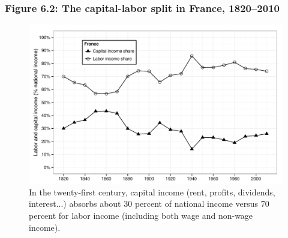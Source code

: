 \documentclass[t]{beamer}\usepackage[]{graphicx}\usepackage[]{color}
\newenvironment{knitrout}{}{} %
\begin{document}
\begin{frame}[label=Figure_6_2]
\frametitle{Figure 6.2: The capital-labor split in France, 1820--2010}
\begin{figure}[t]
\begin{minipage}[b]{\textwidth}
\centering
\begin{knitrout}\footnotesize
{}\color{fgcolor}

{\centering \includegraphics[width=1\linewidth]{figures/bw/Figure_6_2} 

}



\end{knitrout}
\caption{In the twenty-first century, capital income (rent, profits, dividends, interest...) absorbs about 30 percent of national income versus 70 percent for labor income (including both wage and non-wage income).}
\end{minipage}
\end{figure}
\end{frame}
\end{document}
